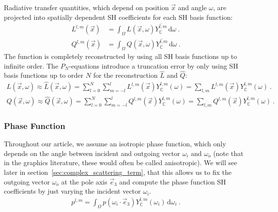 \documentclass{egpubl}
\newcommand{\ud}{\,\mathrm{d}} %
\newcommand{\SHBC}{Y_{\mathbb{C}}} %
\begin{document}
Radiative transfer quantities, which depend on position $\vec{x}$ and angle $\omega$, are projected into spatially dependent SH coefficients for each SH basis function:
\begin{align}
L^{l,m}\left(\vec{x}\right)
&=
\int_\Omega{L\left(\vec{x}, \omega\right)\overline{\SHBC^{l,m}}\ud\omega} \ . \nonumber\\
Q^{l,m}\left(\vec{x}\right)
&=
\int_\Omega{Q\left(\vec{x}, \omega\right)\overline{\SHBC^{l,m}}\ud\omega} \ . \nonumber
\end{align}
The function is completely reconstructed by using all SH basis functions up to infinite order. The $P_N$-equations introduce a truncation error by only using SH basis functions up to order $N$ for the reconstruction $\hat{L}$ and $\hat{Q}$:
\begin{align}
\label{eq:sh_exp_L}
L\left(\vec{x}, \omega\right)
\approx
\hat{L}\left(\vec{x}, \omega\right) =
\sum_{l=0}^{N}
{
\sum_{m=-l}^{l}
{
L^{l,m}\left(\vec{x}\right)\SHBC^{l,m}\left(\omega\right)
}
}
=
\sum_{l,m}
{
L^{l,m}\left(\vec{x}\right)\SHBC^{l,m}\left(\omega\right)
} \ . \nonumber\\
Q\left(\vec{x}, \omega\right)
\approx
\hat{Q}\left(\vec{x}, \omega\right) =
\sum_{l=0}^{N}
{
\sum_{m=-l}^{l}
{
Q^{l,m}\left(\vec{x}\right)\SHBC^{l,m}\left(\omega\right)
}
}
=
\sum_{l,m}
{
Q^{l,m}\left(\vec{x}\right)\SHBC^{l,m}\left(\omega\right)
} \ .
\end{align}

\subsubsection{Phase Function}
\label{sec:complex_proj_phase}

Throughout our article, we assume an isotropic phase function, which only depends on the angle between incident and outgoing vector $\omega_i$ and $\omega_o$ (note that in the graphics literature, these would often be called anisotropic). We will see later in section~\ref{sec:complex_scattering_term}, that this allows us to fix the outgoing vector $\omega_o$ at the pole axis $\vec{e}_3$ and compute the phase function SH coefficients by just varying the incident vector $\omega_i$.
\begin{align*}
p^{l,m}
=
\int_\Omega
{
p\left(\omega_i\cdot\vec{e}_3\right)
\SHBC^{l,m}\left(\omega_i\right)
\ud\omega_i
} \ .
\nonumber
\end{align*}
\end{document}

